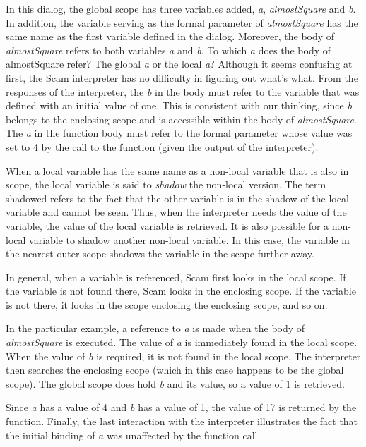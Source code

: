 In this dialog, the global scope has three
variables added, {\it a}, {\it almostSquare} and
{\it b}.
In addition, the variable serving as the formal parameter
of {\it almostSquare} has the same name as the first variable
defined in the dialog. Moreover, the body of {\it almostSquare}
refers to both variables {\it a} and {\it b}. To which {\it a} does
the body of almostSquare refer? The global {\it a} or the local {\it a}?
Although it seems confusing at first,
the Scam interpreter has no difficulty in figuring out
what's what. From the responses of the interpreter,
the {\it b} in the body must refer to the variable that was
defined with an initial value of one. This is consistent with
our thinking, since {\it b} belongs to the enclosing scope
and is accessible within the body of {\it almostSquare}.
The {\it a} in the function body must refer to the
formal parameter whose value was set to 4 by the call to
the function (given the output of the interpreter).

When a local variable has the same name as a non-local variable
that is also in scope, the local variable is said to
{\it shadow} the non-local version. The term shadowed refers to the fact
that the other variable is in the shadow of the local
variable and cannot be seen. Thus, when the
interpreter needs the value of the variable, the value of
the local variable is retrieved.
It is also possible for a non-local variable to shadow
another non-local variable. In this case, the variable
in the nearest outer scope shadows the variable in
the scope further away.

In general, when a variable is referenced,
Scam first looks in the local
scope.
If the variable is not found there,
Scam looks in the enclosing scope.
If the variable is not there,
it looks in the scope enclosing the enclosing scope, 
and so on.

In the particular example,
a reference to {\it a} is made when the body of
{\it almostSquare} is executed. The value of {\it a}
is immediately found in the local scope.
When the value of {\it b} is required,
it is not found in the local scope. The interpreter
then searches the enclosing scope (which in this case happens
to be the global scope).
The global scope does hold {\it b} and its value, so a value
of 1 is retrieved.

Since {\it a} has a value of 4 and {\it b} has a value of 1, the
value of 17 is returned by the function. Finally, the
last interaction with the interpreter illustrates the
fact that the initial binding of {\it a} was unaffected by the
function call.

